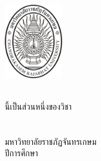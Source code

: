 \makeatletter
\clearpage\pagestyle{empty}
	{\centering
	\fontsize{16}{18.4}\selectfont
		\includegraphics[width=1in]{CRU_LOGO/CRU_Chandra}\\\vspace{\baselineskip}
		\bfseries\@thesistitleThai\\
		\bfseries\@thesistitle
	\vfill
	\fontsize{14}{16.1}\selectfont 
	
	\@authorThai
	\vfill

	\fontsize{13.1}{16.1}\selectfont
	\@typeofwritingThai นี้เป็นส่วนหนึ่งของวิชา\@researchsubjectThai\\
	\ifdefined\@degreeThai \@degreeThai\space\fi \ifdefined\@majorThai \@majorThai\space\fi \\
	\ifdefined\@facultyThai \@facultyThai\fi \\
	มหาวิทยาลัยราชภัฏจันทรเกษม\\
	ปีการศึกษา \the\year
	\par}


\cleardoublepage
\newpage


%
%
%
%


